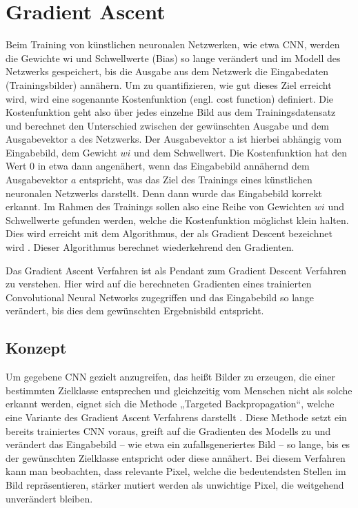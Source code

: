 \chapter{Gradient Ascent}
\label{cha:gascent}

Beim Training von künstlichen neuronalen Netzwerken, wie etwa \ac{CNN}, werden die Gewichte wi und Schwellwerte (Bias) so lange verändert und im Modell des Netzwerks gespeichert, bis die Ausgabe aus dem Netzwerk die Eingabedaten (Trainingsbilder) annähern. Um zu quantifizieren, wie gut dieses Ziel erreicht wird, wird eine sogenannte Kostenfunktion (engl. cost function) definiert. 
Die Kostenfunktion geht also über jedes einzelne Bild aus dem Trainingsdatensatz und berechnet den Unterschied zwischen der gewünschten Ausgabe und dem Ausgabevektor a des Netzwerks.
Der Ausgabevektor a ist hierbei abhängig vom Eingabebild, dem Gewicht $wi$ und dem Schwellwert.
Die Kostenfunktion hat den Wert 0 in etwa dann angenähert, wenn das Eingabebild annähernd dem Ausgabevektor $a$ entspricht, was das Ziel des Trainings eines künstlichen neuronalen Netzwerks darstellt. Denn dann wurde das Eingabebild korrekt erkannt.
Im Rahmen des Trainings sollen also eine Reihe von Gewichten $wi$ und Schwellwerte gefunden werden, welche die Kostenfunktion möglichst klein halten. 
Dies wird erreicht mit dem Algorithmus, der als Gradient Descent bezeichnet wird \cite{zhou_understanding_2018}.
Dieser Algorithmus berechnet wiederkehrend den Gradienten. 


Das Gradient Ascent Verfahren ist als Pendant zum Gradient Descent Verfahren zu verstehen. Hier wird auf die berechneten Gradienten eines trainierten Convolutional Neural Networks zugegriffen und das Eingabebild so lange verändert, bis dies dem gewünschten Ergebnisbild entspricht.


\section{Konzept}
Um gegebene \ac{CNN} gezielt anzugreifen, das heißt Bilder zu erzeugen, die einer bestimmten Zielklasse entsprechen und gleichzeitig vom Menschen nicht als solche erkannt werden, eignet sich die Methode „Targeted Backpropagation“, welche eine Variante des Gradient Ascent Verfahrens darstellt \cite{liu_delving_2016}.
Diese Methode setzt ein bereits trainiertes \ac{CNN} voraus, greift auf die Gradienten des Modells zu und verändert das Eingabebild – wie etwa ein zufallsgeneriertes Bild – so lange, bis es der gewünschten Zielklasse entspricht oder diese annähert. 
Bei diesem Verfahren kann man beobachten, dass relevante Pixel, welche die bedeutendsten Stellen im Bild repräsentieren, stärker mutiert werden als unwichtige Pixel, die weitgehend unverändert bleiben.


